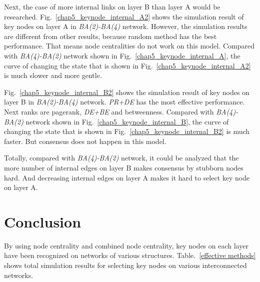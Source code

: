 Next, the case of more internal links on layer B than layer A would be researched. 
Fig.~\ref{chap5_keynode_internal_A2} shows the simulation result of key nodes on layer A in \textit{BA(2)-BA(4)} network. However, the simulation results are different from other results, because random method has the best performance. That means node centralities do not work on this model. Compared with \textit{BA(4)-BA(2)} network shown in Fig.~\ref{chap5_keynode_internal_A}, the curve of changing the state that is shown in Fig.~\ref{chap5_keynode_internal_A2}  is much slower and more gentle.

Fig.~\ref{chap5_keynode_internal_B2} shows the simulation result of key nodes on layer B in \textit{BA(2)-BA(4)} network. \textit{PR+DE} has the most effective performance. Next ranks are pagerank, \textit{DE+BE} and betweenness. Compared with \textit{BA(4)-BA(2)} network shown in Fig.~\ref{chap5_keynode_internal_B}, the curve of changing the state that is shown in Fig.~\ref{chap5_keynode_internal_B2} is much faster. But consensus does not happen in this model.

Totally, compared with \textit{BA(4)-BA(2)} network, it could be analyzed that the more number of internal edges on layer B makes consensus by stubborn nodes hard. And decreasing internal edges on layer A makes it hard to select key node on layer A.\\   

\section{Conclusion}
By using node centrality and combined node centrality, key nodes on each layer have been recognized on networks of various structures. Table.~\ref{effective methods} shows total simulation results for selecting key nodes on various interconnected networks.
 
